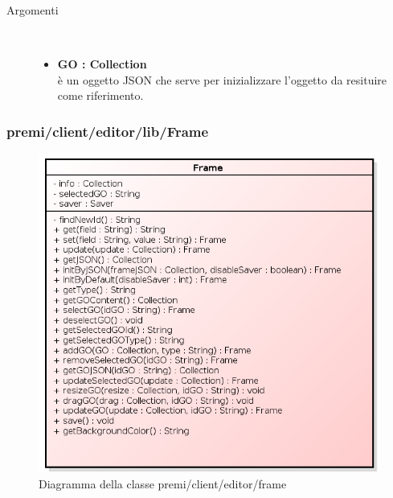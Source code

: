 \begin{description}
\begin{description}
		\begin{description}
			\item[Argomenti] \hfill \\
				\begin{itemize}
				
					\item \textbf{GO : Collection			} \hfill \\
					è un oggetto JSON che serve per inizializzare l'oggetto da resituire come riferimento.
				\end{itemize}
		\end{description}

\end{description}

\end{description}

\subsubsection{premi/client/editor/lib/Frame}
\begin{figure}[h]
\begin{center}
\includegraphics[scale=0.40]{img/diacla/frame.png}
\caption{Diagramma della classe premi/client/editor/frame}
\end{center}
\end{figure}

